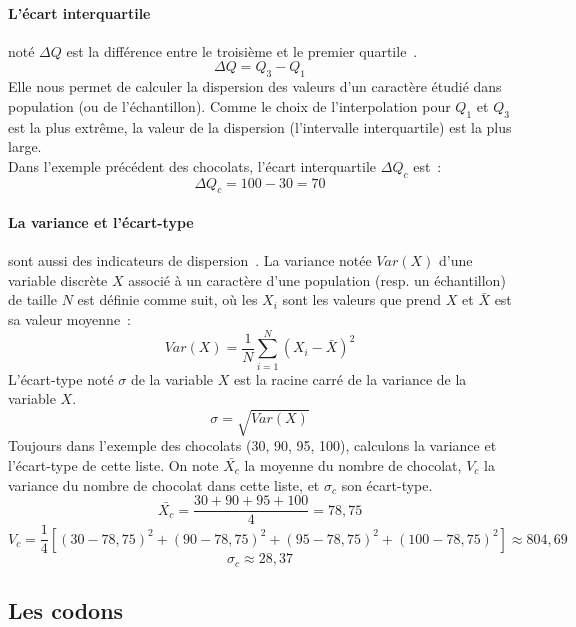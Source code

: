 \documentclass[12pt]{article}
\begin{document}
\paragraph{L'écart interquartile} noté $\Delta Q$ est la différence entre le troisième et le premier quartile~\cite{EI}.
    \begin{equation}
        \Delta Q = Q_3 - Q_1
        \label{intquart}
    \end{equation}
Elle nous permet de calculer la dispersion des valeurs d'un caractère étudié dans population (ou de l'échantillon). Comme le choix de l'interpolation pour $Q_1$ et $Q_3$ est la plus extrême, la valeur de la dispersion (l'intervalle interquartile) est la plus large.\\
Dans l'exemple précédent des chocolats, l'écart interquartile $\Delta Q_c$ est~:
\[\Delta Q_c = 100 - 30 = 70\]

\paragraph{La variance et l'écart-type} sont aussi des indicateurs de dispersion~\cite{dispersion}. La variance notée $Var(X)$ d'une variable discrète $X$ associé à un caractère d'une population (resp. un échantillon) de taille $N$ est définie comme suit, où les $X_i$ sont les valeurs que prend $X$ et $\bar{X}$ est sa valeur moyenne~:
    \begin{equation}
        Var(X) = \frac{1}{N} \sum_{i=1}^{N} (X_i-\bar{X})^2
        \label{var}
    \end{equation}
L'écart-type noté $\sigma$ de la variable $X$ est la racine carré de la variance de la variable $X$.
    \begin{equation}
        \sigma = \sqrt{Var(X)}
        \label{ecartt}
    \end{equation}
Toujours dans l'exemple des chocolats (30, 90, 95, 100), calculons la variance et l'écart-type de cette liste. On note $\bar{X_c}$ la moyenne du nombre de chocolat, $V_c$ la variance du nombre de chocolat dans cette liste, et $\sigma_c$ son écart-type.
    \[\bar{X_c} = \frac{30 + 90 + 95 + 100}{4} = 78,75\]
    \[V_c = \frac{1}{4}[(30 - 78,75)^2 + (90 - 78,75)^2 + (95 - 78,75)^2 + (100 - 78,75)^2] \approx 804,69\]
    \[\sigma_c \approx 28,37\]

\subsection{Les codons} 
 
\end{document}
